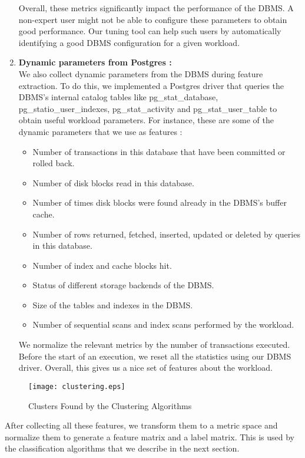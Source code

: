 \begin{enumerate}
{  Overall, these metrics significantly impact the performance of the DBMS. A
  non-expert user might not be able to configure these parameters to obtain
  good performance. Our tuning tool can help such users by automatically
  identifying a good DBMS configuration for a given workload.  
  }
  
  \item {\textbf{Dynamic parameters from Postgres :}\\
  We also collect dynamic parameters from the DBMS during feature extraction.
  To do this, we implemented a Postgres driver that queries the DBMS's internal
  catalog tables like pg\_stat\_database, pg\_statio\_user\_indexes,
  pg\_stat\_activity and pg\_stat\_user\_table
  to obtain useful workload parameters. For instance, these are some of the
  dynamic parameters that we use as features :\\
  
  \begin{itemize}    
    \item {Number of transactions in this database that have been committed or
    rolled back.}
    \item {Number of disk blocks read in this database.}
    \item {Number of times disk blocks were found already in the DBMS's buffer
    cache.}
    \item {Number of rows returned, fetched, inserted, updated or deleted by
    queries in this database.}
    \item {Number of index and cache blocks hit.}
    \item {Status of different storage backends of the DBMS.}
    \item {Size of the tables and indexes in the DBMS.}
    \item {Number of sequential scans and index scans performed by the
    workload.}
  \end{itemize}
  
  	We normalize the relevant metrics by the number of transactions executed.
  	Before the start of an execution, we reset all the statistics using our
  	DBMS driver. Overall, this gives us a nice set of features about the
  	workload. }
\end{enumerate}

\begin{figure*}
    \centering
    \texttt{[image: clustering.eps]}
    \caption{Clusters Found by the Clustering Algorithms}
    \label{fig:clusters}
\end{figure*}

After collecting all these features, we transform them to a metric space and
normalize them to generate a feature matrix and a label matrix. This is 
used by the classification algorithms that we describe in the next section.
